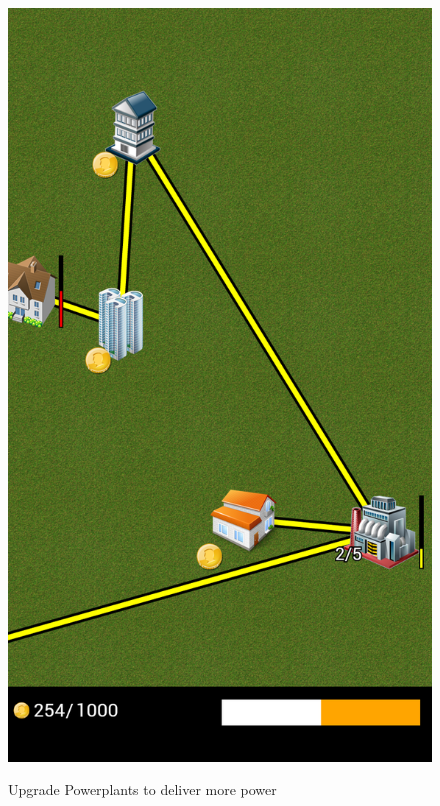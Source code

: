 \begin{figure}[H]
{			\includegraphics[scale=0.18]{pictures/sprint3-screen/serve.png}
		}
		\caption{Upgrade Powerplants to deliver more power}
	\end{figure}

